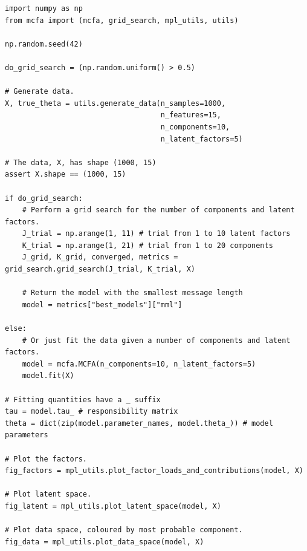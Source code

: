 \documentclass[twocolumn]{aastex62}
\begin{document}
\begin{verbatim}
import numpy as np
from mcfa import (mcfa, grid_search, mpl_utils, utils)

np.random.seed(42)

do_grid_search = (np.random.uniform() > 0.5)

# Generate data.
X, true_theta = utils.generate_data(n_samples=1000,
                                    n_features=15,
                                    n_components=10,
                                    n_latent_factors=5)

# The data, X, has shape (1000, 15)
assert X.shape == (1000, 15)

if do_grid_search:
    # Perform a grid search for the number of components and latent factors.
    J_trial = np.arange(1, 11) # trial from 1 to 10 latent factors 
    K_trial = np.arange(1, 21) # trial from 1 to 20 components
    J_grid, K_grid, converged, metrics = grid_search.grid_search(J_trial, K_trial, X)

    # Return the model with the smallest message length
    model = metrics["best_models"]["mml"]

else:
    # Or just fit the data given a number of components and latent factors.
    model = mcfa.MCFA(n_components=10, n_latent_factors=5)
    model.fit(X)

# Fitting quantities have a _ suffix
tau = model.tau_ # responsibility matrix
theta = dict(zip(model.parameter_names, model.theta_)) # model parameters

# Plot the factors.
fig_factors = mpl_utils.plot_factor_loads_and_contributions(model, X)

# Plot latent space.
fig_latent = mpl_utils.plot_latent_space(model, X)

# Plot data space, coloured by most probable component.
fig_data = mpl_utils.plot_data_space(model, X)
\end{verbatim}
\end{document}
